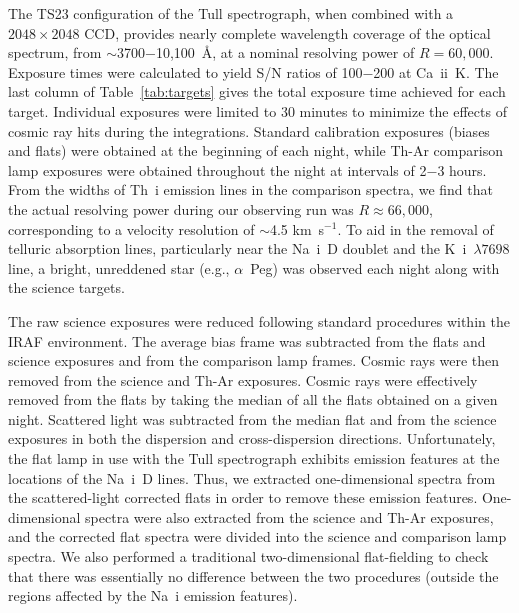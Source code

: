 \documentclass[fleqn,usenatbib]{mnras}
\begin{document}
The TS23 configuration of the Tull spectrograph, when combined with a $2048\times2048$ CCD, provides nearly complete wavelength coverage of the optical spectrum, from $\sim$3700$-$10,100~\AA{}, at a nominal resolving power of $R=60,000$. Exposure times were calculated to yield S/N ratios of 100$-$200 at Ca~{\sc ii}~K. The last column of Table~\ref{tab:targets} gives the total exposure time achieved for each target. Individual exposures were limited to 30 minutes to minimize the effects of cosmic ray hits during the integrations. Standard calibration exposures (biases and flats) were obtained at the beginning of each night, while Th-Ar comparison lamp exposures were obtained throughout the night at intervals of 2$-$3 hours. From the widths of Th~{\sc i} emission lines in the comparison spectra, we find that the actual resolving power during our observing run was $R\approx66,000$, corresponding to a velocity resolution of $\sim$4.5 km~s$^{-1}$. To aid in the removal of telluric absorption lines, particularly near the Na~{\sc i}~D doublet and the K~{\sc i}~$\lambda7698$ line, a bright, unreddened star (e.g., $\alpha$~Peg) was observed each night along with the science targets.

The raw science exposures were reduced following standard procedures within the IRAF environment. The average bias frame was subtracted from the flats and science exposures and from the comparison lamp frames. Cosmic rays were then removed from the science and Th-Ar exposures. Cosmic rays were effectively removed from the flats by taking the median of all the flats obtained on a given night. Scattered light was subtracted from the median flat and from the science exposures in both the dispersion and cross-dispersion directions. Unfortunately, the flat lamp in use with the Tull spectrograph exhibits emission features at the locations of the Na~{\sc i}~D lines. Thus, we extracted one-dimensional spectra from the scattered-light corrected flats in order to remove these emission features. One-dimensional spectra were also extracted from the science and Th-Ar exposures, and the corrected flat spectra were divided into the science and comparison lamp spectra. We also performed a traditional two-dimensional flat-fielding to check that there was essentially no difference between the two procedures (outside the regions affected by the Na~{\sc i} emission features).
\end{document}
